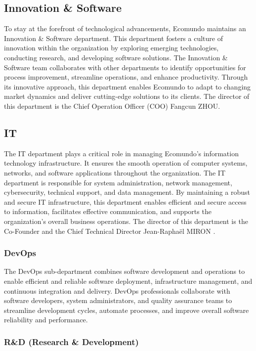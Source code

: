 \documentclass[a4paper,12pt,twoside]{report}
\begin{document}
\subsection{Innovation \& Software}

To stay at the forefront of technological advancements, Ecomundo maintains an Innovation \& Software department. This department fosters a culture of innovation within the organization by exploring emerging technologies, conducting research, and developing software solutions. The Innovation \& Software team collaborates with other departments to identify opportunities for process improvement, streamline operations, and enhance productivity. Through its innovative approach, this department enables Ecomundo to adapt to changing market dynamics and deliver cutting-edge solutions to its clients. The director of this department is the Chief Operation Officer (COO) Fangcun ZHOU.

\subsection{IT}

The IT department plays a critical role in managing Ecomundo's information technology infrastructure. It ensures the smooth operation of computer systems, networks, and software applications throughout the organization. The IT department is responsible for system administration, network management, cybersecurity, technical support, and data management. By maintaining a robust and secure IT infrastructure, this department enables efficient and secure access to information, facilitates effective communication, and supports the organization's overall business operations. The director of this department is the Co-Founder and the Chief Technical Director Jean-Raphaël MIRON .


\subsubsection{DevOps}

The DevOps sub-department combines software development and operations to enable efficient and reliable software deployment, infrastructure management, and continuous integration and delivery. DevOps professionals collaborate with software developers, system administrators, and quality assurance teams to streamline development cycles, automate processes, and improve overall software reliability and performance.

\subsubsection{R\&D (Research \& Development)}
\end{document}
